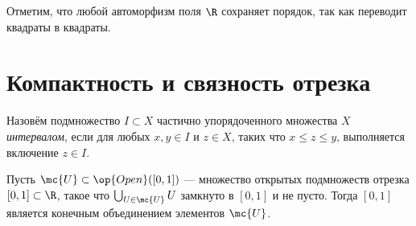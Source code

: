 \documentclass[
	extrafontsizes,
	11pt,
	hyphens,
]{memoir}
\begin{document}
\begin{remark}
Отметим, что любой автоморфизм поля \(\R\) сохраняет порядок, так как переводит квадраты в квадраты.
\end{remark}


\section{Компактность и связность отрезка}

\begin{definition}
Назовём подмножество \(I \subset X\) частично упорядоченного множества \(X\) \emph{интервалом}, если для любых \(x,y \in I\) и \(z \in X\), таких что \(x \leq z \leq y\), выполняется включение \(z \in I\).
\end{definition}

\begin{theorem}
\label{thm:RealClIntCompConn}
Пусть \(\mc{U} \subset \op{Open}([0,1])\) --- множество открытых подмножеств отрезка \([0,1] \subset \R\),
такое что \(\bigcup_{U \in \mc{U}} U\)
замкнуто в \([0,1]\) и не пусто.
Тогда \([0,1]\) является конечным объединением элементов \(\mc{U}\).
\end{theorem}

\end{document}
